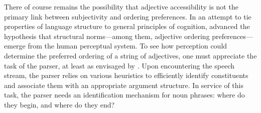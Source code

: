 \documentclass[preprint,authoryear]{elsarticle}\frenchspacing
\begin{document}


There of course remains the possibility that adjective accessibility is not the primary link between subjectivity and ordering preferences. In an attempt to tie properties of language structure to general principles of cognition, \cite{bever1970} advanced the hypothesis that structural norms---among them, adjective ordering preferences---emerge from the human perceptual system. To see how perception could determine the preferred ordering of a string of adjectives, one must appreciate the task of the parser, at least as envisaged by \citeauthor{bever1970}. Upon encountering the speech stream, the parser relies on various heuristics to efficiently identify constituents and associate them with an appropriate argument structure. In service of this task, the parser needs an identification mechanism for noun phrases: where do they begin, and where do they end? 
\end{document}
